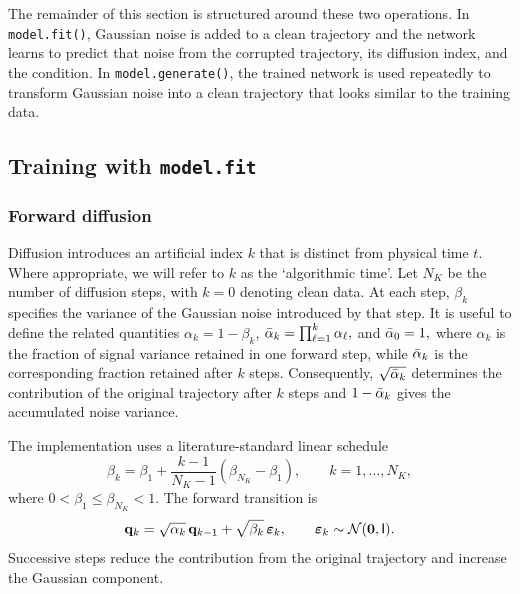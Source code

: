 The remainder of this section is structured around these two operations. In \texttt{model.fit()}, Gaussian noise is added to a clean trajectory and the network learns to predict that noise from the corrupted trajectory, its diffusion index, and the condition. In \texttt{model.generate()}, the trained network is used repeatedly to transform Gaussian noise into a clean trajectory that looks similar to the training data.


\subsection{Training with \texttt{model.fit}}
\label{ssec:fit}

\subsubsection{Forward diffusion}

Diffusion introduces an artificial index $k$ that is distinct from physical time $t$. Where appropriate, we will refer to $k$ as the `algorithmic time'. Let $N_K$ be the number of diffusion steps, with $k=0$ denoting clean data. At each step, $\beta_k$ specifies the variance of the Gaussian noise introduced by that step. It is useful to define the related quantities $\alpha_k = 1-\beta_k$,  $\bar{\alpha}_k= \prod_{\ell=1}^{k}\alpha_\ell,$ and $\bar{\alpha}_0=1,$ where $\alpha_k$ is the fraction of signal variance retained in one forward step, while $\bar{\alpha}_k$ is the corresponding fraction retained after $k$ steps. Consequently, $\sqrt{\bar{\alpha}_k}$ determines the contribution of the original trajectory after $k$ steps and $1-\bar{\alpha}_k$ gives the accumulated noise variance.

The implementation uses a literature-standard linear schedule
\begin{equation}
    \beta_k
    =
    \beta_1
    +
    \frac{k-1}{N_K-1}
    \left(
        \beta_{N_K}-\beta_1
    \right),
    \qquad
    k=1,\ldots,N_K,
    \label{eq:beta_schedule}
\end{equation}
where
$0<\beta_1\leq\beta_{N_K}<1$. The forward transition is
\begin{equation}
    \mathbf{q}_k
    =
    \sqrt{\alpha_k}\,\mathbf{q}_{k-1}
    +
    \sqrt{\beta_k}\,\boldsymbol{\varepsilon}_k,
    \qquad
    \boldsymbol{\varepsilon}_k
    \sim
    \mathcal{N}(\mathbf{0},\mathsf{I}).
    \label{eq:forward_step}
\end{equation}
Successive steps reduce the contribution from the original trajectory and increase the Gaussian component.

